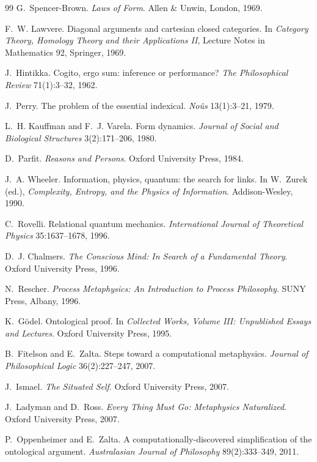 \documentclass[11pt]{article}
\theoremstyle{remark}
\begin{document}
\begin{thebibliography}{99}
 G.~Spencer-Brown. \emph{Laws of Form}. Allen \& Unwin, London, 1969.

 F.~W. Lawvere. Diagonal arguments and cartesian closed categories. In \emph{Category Theory, Homology Theory and their Applications II}, Lecture Notes in Mathematics 92, Springer, 1969.

 J.~Hintikka. Cogito, ergo sum: inference or performance? \emph{The Philosophical Review} 71(1):3--32, 1962.

 J.~Perry. The problem of the essential indexical. \emph{No\^us} 13(1):3--21, 1979.

 L.~H. Kauffman and F.~J. Varela. Form dynamics. \emph{Journal of Social and Biological Structures} 3(2):171--206, 1980.

 D.~Parfit. \emph{Reasons and Persons}. Oxford University Press, 1984.

 J.~A. Wheeler. Information, physics, quantum: the search for links. In W.~Zurek (ed.), \emph{Complexity, Entropy, and the Physics of Information}. Addison-Wesley, 1990.

 C.~Rovelli. Relational quantum mechanics. \emph{International Journal of Theoretical Physics} 35:1637--1678, 1996.

 D.~J. Chalmers. \emph{The Conscious Mind: In Search of a Fundamental Theory}. Oxford University Press, 1996.

 N.~Rescher. \emph{Process Metaphysics: An Introduction to Process Philosophy}. SUNY Press, Albany, 1996.

 K.~G\"odel. Ontological proof. In \emph{Collected Works, Volume III: Unpublished Essays and Lectures}. Oxford University Press, 1995.

 B.~Fitelson and E.~Zalta. Steps toward a computational metaphysics. \emph{Journal of Philosophical Logic} 36(2):227--247, 2007.

 J.~Ismael. \emph{The Situated Self}. Oxford University Press, 2007.

 J.~Ladyman and D.~Ross. \emph{Every Thing Must Go: Metaphysics Naturalized}. Oxford University Press, 2007.

 P.~Oppenheimer and E.~Zalta. A computationally-discovered simplification of the ontological argument. \emph{Australasian Journal of Philosophy} 89(2):333--349, 2011.


\end{thebibliography}
\end{document}
